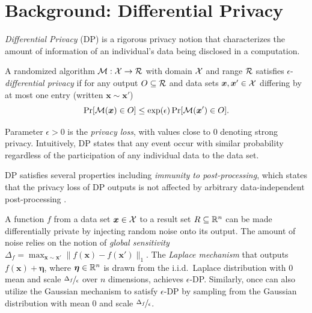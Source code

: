\section*{Background: Differential Privacy}



\emph{Differential Privacy} \cite{Dwork:06} (DP) is a rigorous privacy notion that characterizes the amount of
information
of an individual's data being disclosed in a computation.


\begin{definition}%
	A randomized algorithm $\mathcal{M}:\mathcal{X} \to \mathcal{R}$ with domain $\mathcal{X}$ and range $\mathcal{R}$ satisfies $\epsilon$-\emph{differential privacy} if
	for any output $O \subseteq \mathcal{R}$ and data sets $\bm{x}, \bm{x}' \in \mathcal{X}$ differing by at most one entry (written $\bm{x} \sim \bm{x}'$)
	\begin{equation}
		\label{eq:dp}
		\Pr[\mathcal{M}(\bm{x}) \in O] \leq \exp(\epsilon) \Pr[\mathcal{M}(\bm{x}') \in O].
	\end{equation}
\end{definition}

\noindent
Parameter $\epsilon \!>\! 0$ is the \emph{privacy loss}, with values close
to $0$ denoting strong privacy. Intuitively, DP states that
any event occur with similar probability regardless of the participation
of any individual data to the data set.

DP satisfies several properties including
\emph{immunity to post-processing}, which states that the privacy
loss of DP outputs is not affected by arbitrary data-independent
post-processing \cite{Dwork:13}.

A function $f$ from a data set $\bm{x} \in \mathcal{X}$ to a result set
$R \subseteq \mathbb{R}^n$ can be made differentially private by injecting
random noise onto its output. The amount of noise relies on the notion
of \emph{global sensitivity} %
\(
\Delta_f = \max_{\bm{x} \sim \bm{x}'} \| f(\bm{x}) - f(\bm{x}') \|_1.
\)
The \emph{Laplace mechanism} \cite{Dwork:06} that outputs $f(\bm{x}) + \bm{\eta}$, where $\bm{\eta} \in \mathbb{R}^n$ is drawn from the i.i.d.~Laplace distribution with $0$ mean and scale  $\nicefrac{\Delta_f}{\epsilon}$ over $n$ dimensions, achieves $\epsilon$-DP. Similarly, once can also utilize the Gaussian mechanism to satisfy $\epsilon$-DP by sampling from the Gaussian distribution with mean 0 and scale $\nicefrac{\Delta_f}{\epsilon}$.

